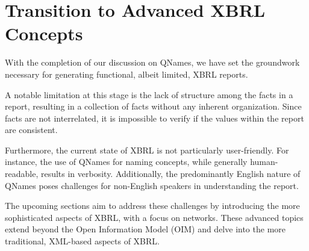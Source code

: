 \section{Transition to Advanced XBRL Concepts}

With the completion of our discussion on QNames, 
we have set the groundwork necessary for generating functional, albeit limited, XBRL reports.


A notable limitation at this stage is the lack of structure among the facts in a report, 
resulting in a collection of facts without any inherent organization. 
Since facts are not interrelated, it is impossible to verify if the values within the report are consistent.

Furthermore, the current state of XBRL is not particularly user-friendly. 
For instance, the use of QNames for naming concepts, while generally human-readable, results in verbosity. 
Additionally, the predominantly English nature of QNames poses challenges for non-English speakers in understanding the report.

The upcoming sections aim to address these challenges by introducing the more sophisticated aspects of XBRL, with a focus on networks. 
These advanced topics extend beyond the Open Information Model (OIM) and delve into the more traditional, XML-based aspects of XBRL.

